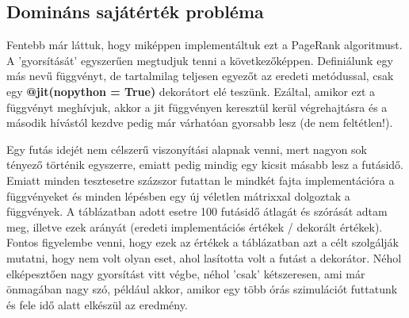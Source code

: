 \documentclass{article}
\theoremstyle{definition}
\theoremstyle{theorem}
\begin{document}
\subsection{Domináns sajátérték probléma}
Fentebb már láttuk, hogy miképpen implementáltuk ezt a PageRank algoritmust. A 'gyorsítását' egyszerűen megtudjuk tenni a következőképpen. Definiálunk egy más nevű függvényt, de tartalmilag teljesen egyezőt az eredeti metódussal, csak egy \textbf{@jit(nopython = True)} dekorátort elé teszünk. Ezáltal, amikor ezt a függvényt meghívjuk, akkor a jit függvényen keresztül kerül végrehajtásra és a második hívástól kezdve pedig már várhatóan gyorsabb lesz (de nem feltétlen!).
\pagebreak

Egy futás idejét nem célszerű viszonyítási alapnak venni, mert nagyon sok tényező történik egyszerre, emiatt pedig mindig egy kicsit másabb lesz a futásidő. Emiatt minden tesztesetre százszor futattan le mindkét fajta implementációra a függvényeket és minden lépésben egy új véletlen mátrixxal dolgoztak a függvények.\newline
A táblázatban adott esetre 100 futásidő átlagát és szórását adtam meg, illetve ezek arányát (eredeti implementációs értékek / dekorált értékek). Fontos figyelembe venni, hogy ezek az értékek a táblázatban azt a célt szolgálják mutatni, hogy nem volt olyan eset, ahol lasította volt a futást a dekorátor. Néhol elképesztően nagy gyorsítást vitt végbe, néhol 'csak' kétszeresen, ami már önmagában nagy szó, például akkor, amikor egy több órás szimulációt futtatunk és fele idő alatt elkészül az eredmény.
\end{document}
